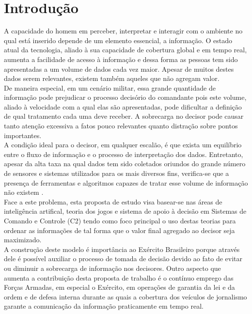 \documentclass[a4paper,12pt]{article}
\begin{document}
\section{Introdução}
A capacidade do homem em perceber, interpretar e interagir com o ambiente no qual está inserido depende de um elemento essencial, a informação.
O estado atual da tecnologia, aliado à sua capacidade de cobertura global e em tempo real, aumenta a facilidade de acesso à informação e dessa forma as pessoas 
tem sido apresentadas a um volume de dados cada vez maior. Apesar de muitos destes dados serem relevantes, existem também aqueles que não agregam valor.\\
\indent De maneira especial, em um cenário militar, essa grande quantidade de informação pode prejudicar o processo decisório do 
comandante pois este volume, aliado à velocidade com a qual elas são apresentadas, pode dificultar a definição de qual tratamento cada uma deve receber.
A sobrecarga no decisor pode causar tanto atenção excessiva a fatos pouco relevantes quanto distração sobre pontos importantes.\\
\indent A condição ideal para o decisor, em qualquer escalão, é que exista um equilíbrio entre o fluxo de informação e o processo de interpretação dos dados.
Entretanto, apesar da alta taxa na qual dados tem sido coletados oriundos do grande número de sensores e sistemas utilizados para os mais diversos fins, 
verifica-se que a presença de ferramentas e algoritmos capazes de tratar esse volume de informação não existem \cite{Savas 2014}.\\
\indent Face a este problema, esta proposta de estudo visa basear-se nas áreas de inteligência artifical, teoria dos jogos e 
sistema de apoio à decisão em Sistemas de Comando e Controle (C2) tendo como foco principal o uso destas teorias para 
ordenar as informações de tal forma que o valor final agregado ao decisor seja maximizado.\\
\indent A construção deste modelo é importância ao Exército Brasileiro porque através dele é possível auxiliar o processo de tomada de 
decisão devido ao fato de evitar ou diminuir a sobrecarga de informação nos decisores. Outro aspecto que aumenta a 
contribuição desta proposta de trabalho é o contínuo emprego das Forças Armadas, em especial o Exército, em operações 
de garantia da lei e da ordem e de defesa interna durante as quais a cobertura dos veículos de jornalismo garante a 
comunicação da informação praticamente em tempo real.
\end{document}
